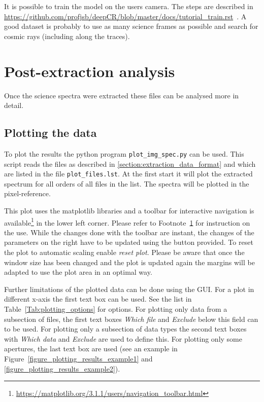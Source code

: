 \documentclass[10pt,a4paper]{article}
\begin{document}
It is possible to train the model on the users camera. The steps are described in 
\url{https://github.com/profjsb/deepCR/blob/master/docs/tutorial_train.rst}~. A good dataset is probably to use as many science frames as possible and search for cosmic rays (including along the traces).



\newpage
\section{Post-extraction analysis}

\noindent Once the science spectra were extracted these files can be analysed more in detail. 

\subsection{Plotting the data}
\label{Section:Plotting_extracted_files}
To plot the results the python program \verb|plot_img_spec.py| can be used. This script reads the files as described in \ref{section:extraction_data_format} and which are listed in the file \verb|plot_files.lst|. At the first start it will plot the extracted spectrum for all orders of all files in the list. The spectra will be plotted in the pixel-reference.

This plot uses the matplotlib libraries and a toolbar for interactive navigation is available\footnote{\label{Footnote:matplotlib_toolbar} \url{https://matplotlib.org/3.1.1/users/navigation_toolbar.html}} in the lower left corner. Please refer to Footnote~\ref{Footnote:matplotlib_toolbar} for instruction on the use. While the changes done with the toolbar are instant, the changes of the parameters on the right have to be updated using the button provided. To reset the plot to automatic scaling enable \textit{reset plot}. Please be aware that once the window size has been changed and the plot is updated again the margins will be adapted to use the plot area in an optimal way.

Further limitations of the plotted data can be done using the GUI. For a plot in different x-axis the first text box can be used. See the list in Table~\ref{Tab:plotting_options} for options. For plotting only data from a subsection of files, the first text boxes \textit{Which file} and \textit{Exclude} below this field can to be used. For plotting only a subsection of data types the second text boxes with \textit{Which data} and \textit{Exclude} are used to define this. For plotting only some apertures, the last text box are used (see an example in Figure~\ref{figure_plotting_results_example1} and \ref{figure_plotting_results_example2}).
\end{document}

